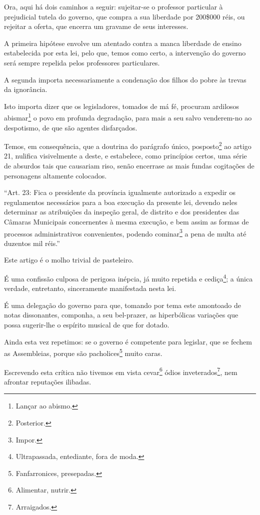Ora, aqui há dois caminhos a seguir: sujeitar-se o professor particular
à prejudicial tutela do governo, que compra a sua liberdade por 200\$000
réis, ou rejeitar a oferta, que encerra um gravame de seus interesses.

A primeira hipótese envolve um atentado contra a manca liberdade de
ensino estabelecida por esta lei, pelo que, temos como certo, a
intervenção do governo será sempre repelida pelos professores
particulares.

A segunda importa necessariamente a condenação dos filhos do pobre às
trevas da ignorância.

Isto importa dizer que os legisladores, tomados de má fé, procuram
ardilosos abismar\footnote{Lançar ao abismo.} o povo em profunda
degradação, para mais a seu salvo venderem-no ao despotismo, de que são
agentes disfarçados.

Temos, em consequência, que a doutrina do parágrafo único,
posposto\footnote{Posterior.} ao artigo 21, nulifica visivelmente a
deste, e estabelece, como princípios certos, uma série de absurdos tais
que causariam riso, senão encerrase as mais fundas cogitações de
personagens altamente colocados.

``Art. 23: Fica o presidente da província igualmente autorizado a expedir
os regulamentos necessários para a boa execução da presente lei, devendo
neles determinar as atribuições da inspeção geral, de distrito e dos
presidentes das Câmaras Municipais concernentes à mesma execução, e bem
assim as formas de processos administrativos convenientes, podendo
cominar\footnote{Impor.} a pena de multa até duzentos mil réis.''

Este artigo é o molho trivial de pasteleiro.

É uma confissão culposa de perigosa inépcia, já muito repetida e
cediça\footnote{Ultrapassada, entediante, fora de moda.}; a única
verdade, entretanto, sinceramente manifestada nesta lei.

É uma delegação do governo para que, tomando por tema este amontoado de
notas dissonantes, componha, a seu bel-prazer, as hiperbólicas variações
que possa sugerir-lhe o espírito musical de que for dotado.

Ainda esta vez repetimos: se o governo é competente para legislar, que
se fechem as Assembleias, porque são pacholices\footnote{
  Fanfarronices, presepadas.} muito caras.

Escrevendo esta crítica não tivemos em vista cevar\footnote{Alimentar,
  nutrir.} ódios inveterados\footnote{Arraigados.}, nem afrontar
reputações ilibadas.

